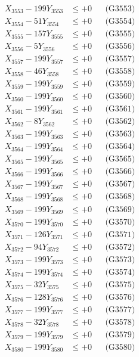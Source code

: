 \documentclass[a4paper,10pt]{article}
\begin{document}
{\begin{align}
X_{3553} - 199Y_{3553} &\leq +0 && \text{(G3553)} \\
X_{3554} - 51Y_{3554} &\leq +0 && \text{(G3554)} \\
X_{3555} - 157Y_{3555} &\leq +0 && \text{(G3555)} \\
X_{3556} - 5Y_{3556} &\leq +0 && \text{(G3556)} \\
X_{3557} - 199Y_{3557} &\leq +0 && \text{(G3557)} \\
X_{3558} - 46Y_{3558} &\leq +0 && \text{(G3558)} \\
X_{3559} - 199Y_{3559} &\leq +0 && \text{(G3559)} \\
X_{3560} - 199Y_{3560} &\leq +0 && \text{(G3560)} \\
\allowbreak
X_{3561} - 199Y_{3561} &\leq +0 && \text{(G3561)} \\
X_{3562} - 8Y_{3562} &\leq +0 && \text{(G3562)} \\
X_{3563} - 199Y_{3563} &\leq +0 && \text{(G3563)} \\
X_{3564} - 199Y_{3564} &\leq +0 && \text{(G3564)} \\
X_{3565} - 199Y_{3565} &\leq +0 && \text{(G3565)} \\
X_{3566} - 199Y_{3566} &\leq +0 && \text{(G3566)} \\
X_{3567} - 199Y_{3567} &\leq +0 && \text{(G3567)} \\
X_{3568} - 199Y_{3568} &\leq +0 && \text{(G3568)} \\
X_{3569} - 199Y_{3569} &\leq +0 && \text{(G3569)} \\
X_{3570} - 199Y_{3570} &\leq +0 && \text{(G3570)} \\
\allowbreak
X_{3571} - 126Y_{3571} &\leq +0 && \text{(G3571)} \\
X_{3572} - 94Y_{3572} &\leq +0 && \text{(G3572)} \\
X_{3573} - 199Y_{3573} &\leq +0 && \text{(G3573)} \\
X_{3574} - 199Y_{3574} &\leq +0 && \text{(G3574)} \\
X_{3575} - 32Y_{3575} &\leq +0 && \text{(G3575)} \\
X_{3576} - 128Y_{3576} &\leq +0 && \text{(G3576)} \\
X_{3577} - 199Y_{3577} &\leq +0 && \text{(G3577)} \\
X_{3578} - 32Y_{3578} &\leq +0 && \text{(G3578)} \\
X_{3579} - 199Y_{3579} &\leq +0 && \text{(G3579)} \\
X_{3580} - 199Y_{3580} &\leq +0 && \text{(G3580)} \\

\end{align}}
\end{document}
